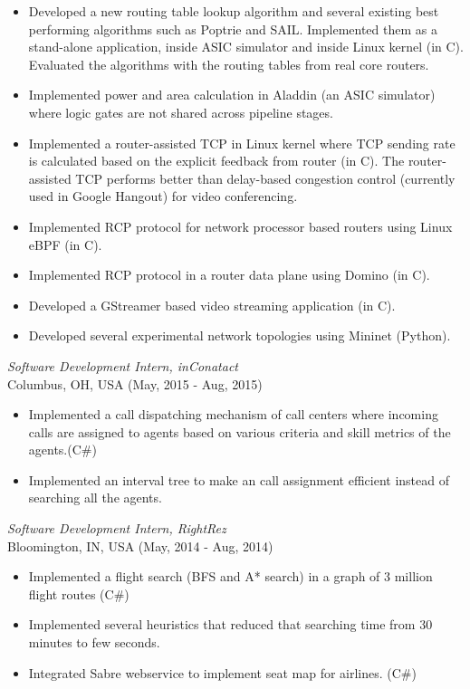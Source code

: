\documentclass{res}
\begin{document}
\begin{resume}
   \begin{itemize} \itemsep -2pt %
  \item Developed a new routing table lookup algorithm and several existing best performing algorithms such as Poptrie and SAIL. Implemented them as a stand-alone application, inside ASIC simulator and inside Linux kernel (in C). Evaluated the algorithms with the routing tables from real core routers.
  \item Implemented power and area calculation in Aladdin (an ASIC simulator) where logic gates are not shared across pipeline stages.
  \item Implemented a router-assisted TCP in Linux kernel where TCP sending rate is calculated based on the explicit feedback from router (in C). The router-assisted TCP performs better than delay-based congestion control (currently used in Google Hangout) for video conferencing.  
  \item Implemented RCP protocol for network processor based routers using Linux eBPF (in C). 
  \item Implemented RCP protocol in a router data plane using Domino (in C).
  \item Developed a GStreamer based video streaming application (in C).
  \item Developed several experimental network topologies using Mininet (Python).	
 \end{itemize}

{\sl Software Development Intern, inConatact} \\
Columbus, OH, USA (May, 2015 - Aug, 2015)
 \begin{itemize} \itemsep -2pt
	\item Implemented a call dispatching mechanism of call centers where incoming calls are assigned to agents based on various criteria and skill metrics of the agents.(C\#)
	\item  Implemented an interval tree to make an call assignment efficient instead of searching all the agents.
  \end{itemize} \vspace{-6pt}

{\sl Software Development Intern, RightRez} \\
Bloomington, IN, USA (May, 2014 - Aug, 2014)
\begin{itemize} \itemsep -2pt
	\item  Implemented a flight search (BFS and A* search) in a graph of 3 million flight routes (C\#)
	\item  Implemented several heuristics that reduced that searching time from 30 minutes to few seconds.
    \item  Integrated Sabre webservice to implement seat map for airlines. (C\#)
\end{itemize} \vspace{-6pt}


\end{resume}
\end{document}

